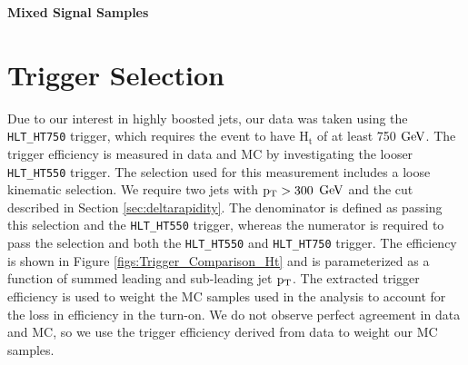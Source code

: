 \begin{table}
\begin{center}
\bf{Mixed Signal Samples}
\end{center}
\caption{Mixed-Coupling signal samples used in the analysis.  Quoted cross-section and $\Gamma_{\wpr}$ were obtained from the CompHEP generator.  A k factor of 1.2 is implemented on the quoted cross-sections.  The cross sections listed here take into account the generator level b jet $\pt$ cut, and represent the visible cross section.  The efficiency of this cut is provided under the column labeled Selection Efficiency.}
\label{table:signalsetsmixed}
\end{table}


\section{Trigger Selection}
\label{sec:trigger}
Due to our interest in highly boosted jets, our data was taken using the \texttt{HLT\_HT750} trigger, which requires the event to have $\mathrm{H_t}$ of at least 750 $\mathrm{GeV}$. 
The trigger efficiency is measured in data and MC by investigating the looser \texttt{HLT\_HT550} trigger.  The selection used for this measurement includes a loose kinematic selection.  We require two jets 
with $\mathrm{p_{T}} > 300$ $\mathrm{GeV}$ and the cut described in Section \ref{sec:deltarapidity}.
The denominator is defined as passing this selection and the \texttt{HLT\_HT550} trigger, whereas the numerator is required to pass the selection and both the \texttt{HLT\_HT550} and \texttt{HLT\_HT750} trigger.  
The efficiency is shown in Figure \ref{figs:Trigger_Comparison_Ht} and is parameterized as a function of summed leading and sub-leading jet $\pt$.  The extracted trigger efficiency is used to weight 
the MC samples used in the analysis to account for the loss in efficiency in the turn-on.  We do not observe perfect agreement in data and MC, 
so we use the trigger efficiency derived from data to weight our MC samples.

